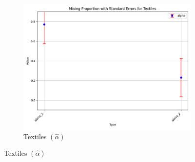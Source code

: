 \documentclass{article}
\begin{document}
\begin{figure}[ht!]
\begin{subfigure}[t]{0.32\textwidth}
    \end{subfigure}
    \begin{subfigure}[t]{0.32\textwidth}
        \centering
        \includegraphics[width=\textwidth]{figure/empirical_stat_normal_kmshare_ciiu_alpha_with_error_bars_Textiles.png}
        \caption{Textiles $(\hat\alpha)$}
    \end{subfigure}


\end{figure}
\end{document}
